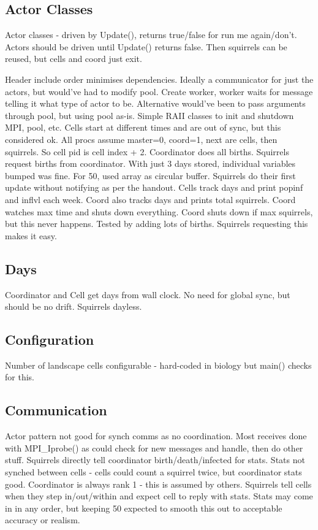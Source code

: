 \documentclass[11pt, oneside]{article}   %
\begin{document}
\subsection{Actor Classes}
Actor classes - driven by Update(), returns true/false for run me again/don't.
Actors should be driven until Update() returns false.
Then squirrels can be reused, but cells and coord just exit.



Header include order minimises dependencies.
Ideally a communicator for just the actors, but would've had to modify pool.
Create worker, worker waits for message telling it what type of actor to be.
Alternative would've been to pass arguments through pool, but using pool as-is.
Simple RAII classes to init and shutdown MPI, pool, etc.
Cells start at different times and are out of sync, but this considered ok.
All procs assume master=0, coord=1, next are cells, then squirrels.
So cell pid is cell index + 2.
Coordinator does all births.
Squirrels request births from coordinator.
With just 3 days stored, individual variables bumped was fine.
For 50, used array as circular buffer.
Squirrels do their first update without notifying as per the handout.
Cells track days and print popinf and inflvl each week.
Coord also tracks days and prints total squirrels.
Coord watches max time and shuts down everything.
Coord shuts down if max squirrels, but this never happens.  Tested by adding lots of births.  Squirrels requesting this makes it easy.

\subsection{Days}
Coordinator and Cell get days from wall clock.
No need for global sync, but should be no drift.
Squirrels dayless. 

\subsection{Configuration}
Number of landscape cells configurable - hard-coded in biology but main() checks for this.

\subsection{Communication}
Actor pattern not good for synch comms as no coordination.
Most receives done with MPI\_Iprobe() as could check for new messages and handle, then do other stuff.
Squirrels directly tell coordinator birth/death/infected for stats.
Stats not synched between cells - cells could count a squirrel twice, but coordinator stats good.
Coordinator is always rank 1 - this is assumed by others.
Squirrels tell cells when they step in/out/within and expect cell to reply with stats.
Stats may come in in any order, but keeping 50 expected to smooth this out to acceptable accuracy or realism.
\end{document}
